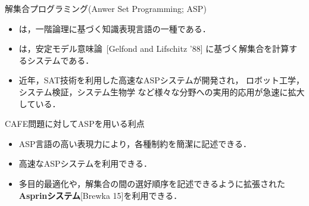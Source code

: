 \documentclass[dvipdfmx, 11pt]{beamer}
\begin{document}
\begin{frame}{解集合プログラミング(Anwer Set Programming; ASP)}
 \begin{itemize}
 \item {}は，一階論理に基づく知識表現言語の一種である．
 \item {}は，安定モデル意味論~[Gelfond and Lifschitz '88]
   に基づく解集合を計算するシステムである．
 \item 近年，SAT技術を利用した高速なASPシステムが開発され，
   ロボット工学，システム検証，システム生物学
   など様々な分野への実用的応用が急速に拡大している．
 \end{itemize}
\vfill
 \begin{alertblock}{CAFE問題に対してASPを用いる利点}
   \begin{itemize} 
    \item ASP言語の高い表現力により，各種制約を簡潔に記述できる．
    \item 高速なASPシステムを利用できる．
    \item 多目的最適化や，解集合の間の選好順序を記述できるように拡張された
	  \alert{\bf Asprinシステム}[Brewka 15]を利用できる．
   \end{itemize}
 \end{alertblock}
\end{frame}
\end{document}
